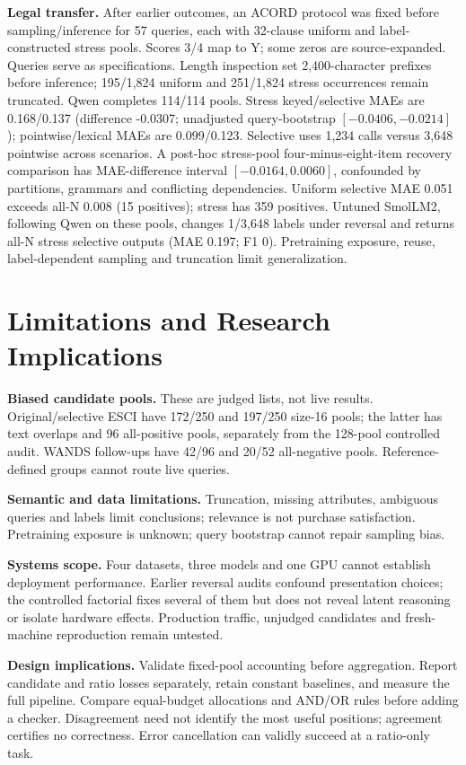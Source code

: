 \documentclass[conference]{IEEEtran}
\begin{document}
\textbf{Legal transfer.} After earlier outcomes, an ACORD protocol \cite{acord} was fixed before sampling/inference for 57 queries, each with 32-clause uniform and label-constructed stress pools. Scores 3/4 map to Y; some zeros are source-expanded. Queries serve as specifications. Length inspection set 2,400-character prefixes before inference; 195/1,824 uniform and 251/1,824 stress occurrences remain truncated. Qwen completes 114/114 pools. Stress keyed/selective MAEs are 0.168/0.137 (difference -0.0307; unadjusted query-bootstrap $[-0.0406,-0.0214]$); pointwise/lexical MAEs are 0.099/0.123. Selective uses 1,234 calls versus 3,648 pointwise across scenarios. A post-hoc stress-pool four-minus-eight-item recovery comparison has MAE-difference interval $[-0.0164,0.0060]$, confounded by partitions, grammars and conflicting dependencies. Uniform selective MAE 0.051 exceeds all-N 0.008 (15 positives); stress has 359 positives. Untuned SmolLM2, following Qwen on these pools, changes 1/3,648 labels under reversal and returns all-N stress selective outputs (MAE 0.197; F1 0). Pretraining exposure, reuse, label-dependent sampling and truncation limit generalization.

\section{Limitations and Research Implications}
\textbf{Biased candidate pools.} These are judged lists, not live results. Original/selective ESCI have 172/250 and 197/250 size-16 pools; the latter has text overlaps and 96 all-positive pools, separately from the 128-pool controlled audit. WANDS follow-ups have 42/96 and 20/52 all-negative pools. Reference-defined groups cannot route live queries.

\textbf{Semantic and data limitations.} Truncation, missing attributes, ambiguous queries and labels limit conclusions; relevance is not purchase satisfaction. Pretraining exposure is unknown; query bootstrap cannot repair sampling bias.

\textbf{Systems scope.} Four datasets, three models and one GPU cannot establish deployment performance. Earlier reversal audits confound presentation choices; the controlled factorial fixes several of them but does not reveal latent reasoning or isolate hardware effects. Production traffic, unjudged candidates and fresh-machine reproduction remain untested.

\textbf{Design implications.} Validate fixed-pool accounting before aggregation. Report candidate and ratio losses separately, retain constant baselines, and measure the full pipeline. Compare equal-budget allocations and AND/OR rules before adding a checker. Disagreement need not identify the most useful positions; agreement certifies no correctness. Error cancellation can validly succeed at a ratio-only task.
\end{document}
